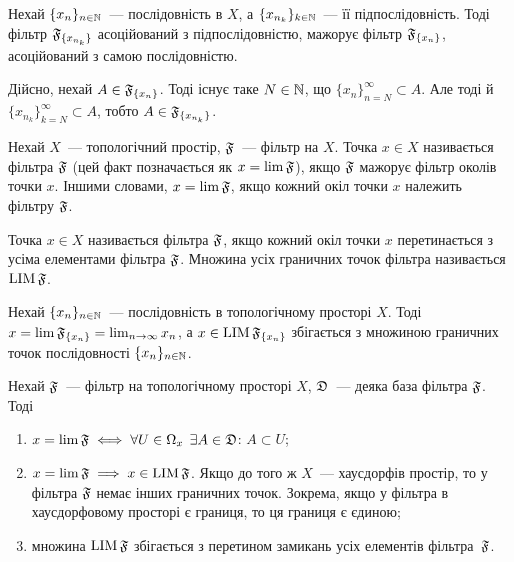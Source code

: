 \begin{example}
    Нехай $\{x_n\}_{n \in \NN}$~--- послідовність в $X$, а $\{x_{n_k}\}_{k \in \NN}$~--- її підпослідовність. Тоді фільтр $\frak F_{\{x_{n_k}\}}$ асоційований з підпослідовністю, мажорує фільтр $\frak F_{\{x_n\}}$, асоційований з самою послідовністю. 
    
    Дійсно, нехай $A \in \frak F_{\{x_n\}}$. Тоді існує таке $N \in \NN$, що $\{x_n\}_{n = N}^\infty \subset A$. Але тоді й $\{x_{n_k}\}_{k = N}^\infty \subset A$, тобто $A \in \frak F_{\{x_{n_k}\}}$.
\end{example}

\begin{definition}
    Нехай $X$~--- топологічний простір, $\frak F$~--- фільтр на $X$. Точка $x \in X$ називається  фільтра $\frak F$ (цей факт позначається як $x = \lim \frak F$), якщо $\frak F$ мажорує фільтр околів точки $x$. Іншими словами, $x = \lim \frak F$, якщо кожний окіл точки $x$ належить фільтру $\frak F$.
\end{definition}

\begin{definition}
    Точка $x \in X$ називається  фільтра $\frak F$, якщо кожний окіл точки $x$ перетинається з усіма елементами фільтра $\frak F$. Множина усіх граничних точок фільтра називається $\LIM \frak F$.
\end{definition}

\begin{example}
    Нехай $\{x_n\}_{n \in \NN}$~--- послідовність в топологічному просторі $X$. Тоді $x = \lim \frak F_{\{x_n\}} = \lim_{ n \to \infty} x_n$, а $x \in \LIM \frak F_{\{x_n\}}$ збігається з множиною граничних точок послідовності $\{x_n\}_{n \in \NN}$.
\end{example}

\begin{theorem}
    Нехай $\frak F$~--- фільтр на топологічному просторі $X$, $\frak D$~--- деяка база фільтра $\frak F$. Тоді
    \begin{enumerate}
        \item $x = \lim \frak F \iff \forall U \in \Omega_x$ $\exists A \in \frak D$: $A \subset U$;
        \item $x = \lim \frak F \implies x \in \LIM \frak F$. Якщо до того ж $X$~--- хаусдорфів простір, то у фільтра $\frak F$ немає інших граничних точок. Зокрема, якщо у фільтра в хаусдорфовому просторі є границя, то ця границя є єдиною;
        \item множина $\LIM \frak F$ збігається з перетином замикань усіх елементів фільтра~$\frak F$.
    \end{enumerate}
\end{theorem}

